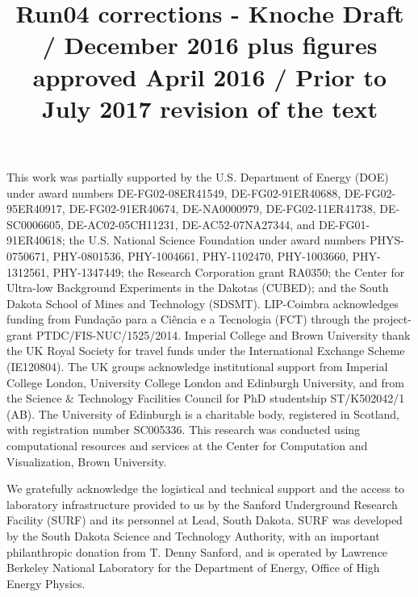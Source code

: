 \documentclass[twocolumn,superscriptaddress,prd]{revtex4-1}
\begin{document}
\title{Run04 corrections - Knoche Draft / December 2016 plus figures approved April 2016 / Prior to July 2017 revision of the text}





		\maketitle










\appendix

%


\begin{acknowledgments}

This work was partially supported by the U.S. Department of Energy (DOE) under award numbers DE-FG02-08ER41549, DE-FG02-91ER40688, DE-FG02-95ER40917, DE-FG02-91ER40674, DE-NA0000979, DE-FG02-11ER41738, DE-SC0006605, DE-AC02-05CH11231, DE-AC52-07NA27344, and DE-FG01-91ER40618; the U.S. National Science Foundation under award numbers PHYS-0750671, PHY-0801536, PHY-1004661, PHY-1102470, PHY-1003660, PHY-1312561, PHY-1347449; the Research Corporation grant RA0350; the Center for Ultra-low Background Experiments in the Dakotas (CUBED); and the South Dakota School of Mines and Technology (SDSMT). LIP-Coimbra acknowledges funding from Funda\c{c}\~{a}o para a Ci\^{e}ncia e a Tecnologia (FCT)   through the project-grant PTDC/FIS-NUC/1525/2014. Imperial College and Brown University thank the UK Royal Society for travel funds under the International Exchange Scheme (IE120804). The UK groups acknowledge institutional support from Imperial College London, University College London and Edinburgh University, and from the Science \& Technology Facilities Council for PhD studentship ST/K502042/1 (AB). The University of Edinburgh is a charitable body, registered in Scotland, with registration number SC005336. This research was conducted using computational resources and services at the Center for Computation and Visualization, Brown University.

We gratefully acknowledge the logistical and technical support and the access to laboratory infrastructure provided to us by the Sanford Underground Research Facility (SURF) and its personnel at Lead, South Dakota. SURF was developed by the South Dakota Science and Technology Authority, with an important philanthropic donation from T. Denny Sanford, and is operated by Lawrence Berkeley National Laboratory for the Department of Energy, Office of High Energy Physics.

\end{acknowledgments}


\newpage
\thispagestyle{empty}
\mbox{}
\newpage
\thispagestyle{empty}
\mbox{}

%


\end{document}
